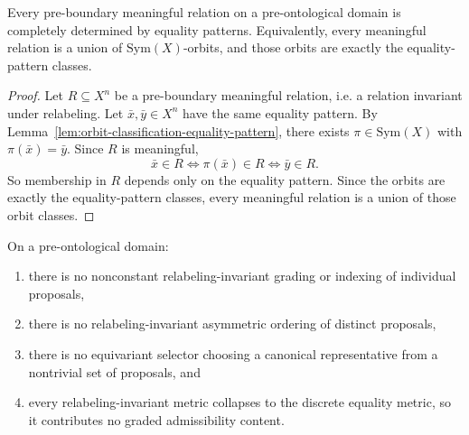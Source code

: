 \begin{theorem}
\label{thm:equality-pattern-completeness}
Every pre-boundary meaningful relation on a pre-ontological domain is completely determined by equality patterns. Equivalently, every meaningful relation is a union of $\mathrm{Sym}(X)$-orbits, and those orbits are exactly the equality-pattern classes.
\end{theorem}

\begin{proof}
Let $R\subseteq X^n$ be a pre-boundary meaningful relation, i.e. a relation invariant under relabeling. Let $\bar x,\bar y\in X^n$ have the same equality pattern. By Lemma~\ref{lem:orbit-classification-equality-pattern}, there exists $\pi\in \mathrm{Sym}(X)$ with $\pi(\bar x)=\bar y$. Since $R$ is meaningful,
\[
  \bar x\in R \iff \pi(\bar x)\in R \iff \bar y\in R.
\]
So membership in $R$ depends only on the equality pattern. Since the orbits are exactly the equality-pattern classes, every meaningful relation is a union of those orbit classes.\cite{MaleyAMetric,MaleyNecessity}
\end{proof}

\begin{corollary}
\label{cor:no-selector-no-order-no-metric}
On a pre-ontological domain:
\begin{enumerate}
  \item there is no nonconstant relabeling-invariant grading or indexing of individual proposals,
  \item there is no relabeling-invariant asymmetric ordering of distinct proposals,
  \item there is no equivariant selector choosing a canonical representative from a nontrivial set of proposals, and
  \item every relabeling-invariant metric collapses to the discrete equality metric, so it contributes no graded admissibility content.
\end{enumerate}
\end{corollary}

